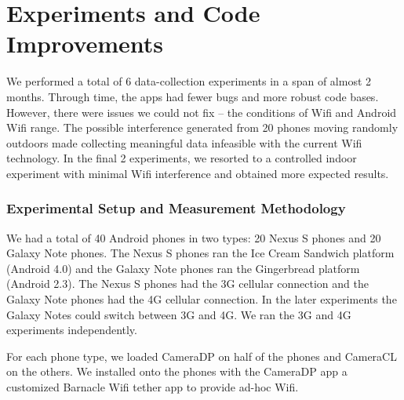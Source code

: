\chapter{Experiments and Code Improvements}

We performed a total of 6 data-collection experiments in a span of almost 2 months. Through time, the apps had fewer bugs and more robust code bases. However, there were issues we could not fix -- the conditions of Wifi and Android Wifi range. The possible interference generated from 20 phones moving randomly outdoors made collecting meaningful data infeasible with the current Wifi technology. In the final 2 experiments, we resorted to a controlled indoor experiment with minimal Wifi interference and obtained more expected results.

\subsection{Experimental Setup and Measurement Methodology}

We had a total of 40 Android phones in two types: 20 Nexus S phones and 20 Galaxy Note phones. The Nexus S phones ran the Ice Cream Sandwich platform (Android 4.0) and the Galaxy Note phones ran the Gingerbread platform (Android 2.3). The Nexus S phones had the 3G cellular connection and the Galaxy Note phones had the 4G cellular connection. In the later experiments the Galaxy Notes could switch between 3G and 4G. We ran the 3G and 4G experiments independently.

For each phone type, we loaded CameraDP on half of the phones and CameraCL on the others. We installed onto the phones with the CameraDP app a customized Barnacle Wifi tether app \cite{barnacle} to provide ad-hoc Wifi. 


